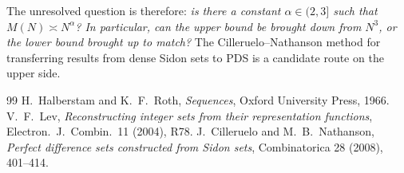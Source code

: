 \documentclass[11pt]{article}
\begin{document}
The unresolved question is therefore: \emph{is there a constant
$\alpha \in (2, 3]$ such that $M(N) \asymp N^\alpha$? In particular,
can the upper bound be brought down from $N^3$, or the lower bound
brought up to match?} The Cilleruelo--Nathanson method
\cite{CiNa08} for transferring results from dense Sidon sets to PDS
is a candidate route on the upper side.

\begin{thebibliography}{99}
 H.~Halberstam and K.~F.~Roth, \emph{Sequences},
  Oxford University Press, 1966.
 V.~F.~Lev, \emph{Reconstructing integer sets from their
  representation functions}, Electron.\ J.\ Combin.\ 11 (2004), R78.
 J.~Cilleruelo and M.~B.~Nathanson, \emph{Perfect
  difference sets constructed from Sidon sets},
  Combinatorica 28 (2008), 401--414.
\end{thebibliography}
\end{document}
